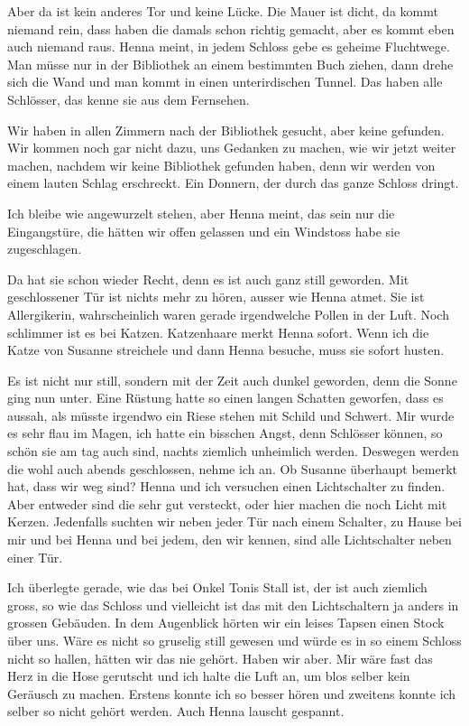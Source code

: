 Aber da ist kein anderes Tor und keine Lücke. Die Mauer ist dicht, da kommt niemand rein, dass haben die damals schon richtig gemacht, aber es kommt eben auch niemand raus. Henna meint, in jedem Schloss gebe es geheime Fluchtwege. Man müsse nur in der Bibliothek an einem bestimmten Buch ziehen, dann drehe sich die Wand und man kommt in einen unterirdischen Tunnel. Das haben alle Schlösser, das kenne sie aus dem Fernsehen.

Wir haben in allen Zimmern nach der Bibliothek gesucht, aber keine gefunden. Wir kommen noch gar nicht dazu, uns Gedanken zu machen, wie wir jetzt weiter machen, nachdem wir keine Bibliothek gefunden haben, denn wir werden von einem lauten Schlag erschreckt. Ein Donnern, der durch das ganze Schloss dringt.

Ich bleibe wie angewurzelt stehen, aber Henna meint, das sein nur die Eingangstüre, die hätten wir offen gelassen und ein Windstoss habe sie zugeschlagen.

Da hat sie schon wieder Recht, denn es ist auch ganz still geworden. Mit geschlossener Tür ist nichts mehr zu hören, ausser wie Henna atmet. Sie ist Allergikerin, wahrscheinlich waren gerade irgendwelche Pollen in der Luft. Noch schlimmer ist es bei Katzen. Katzenhaare merkt Henna sofort. Wenn ich die Katze von Susanne streichele und dann Henna besuche, muss sie sofort husten.

Es ist nicht nur still, sondern mit der Zeit auch dunkel geworden, denn die Sonne ging nun unter. Eine Rüstung hatte so einen langen Schatten geworfen, dass es aussah, als müsste irgendwo ein Riese stehen mit Schild und Schwert. Mir wurde es sehr flau im Magen, ich hatte ein bisschen Angst, denn Schlösser können, so schön sie am tag auch sind, nachts ziemlich unheimlich werden. Deswegen werden die wohl auch abends geschlossen, nehme ich an. Ob Susanne überhaupt bemerkt hat, dass wir weg sind? Henna und ich versuchen einen Lichtschalter zu finden. Aber entweder sind die sehr gut versteckt, oder hier machen die noch Licht mit Kerzen. Jedenfalls suchten wir neben jeder Tür nach einem Schalter, zu Hause bei mir und bei Henna und bei jedem, den wir kennen, sind alle Lichtschalter neben einer Tür.

Ich überlegte gerade, wie das bei Onkel Tonis Stall ist, der ist auch ziemlich gross, so wie das Schloss und vielleicht ist das mit den Lichtschaltern ja anders in grossen Gebäuden. In dem Augenblick hörten wir ein leises Tapsen einen Stock über uns. Wäre es nicht so gruselig still gewesen und würde es in so einem Schloss nicht so hallen, hätten wir das nie gehört. Haben wir aber. Mir wäre fast das Herz in die Hose gerutscht und ich halte die Luft an, um blos selber kein Geräusch zu machen. Erstens konnte ich so besser hören und zweitens konnte ich selber so nicht gehört werden. Auch Henna lauscht gespannt.

